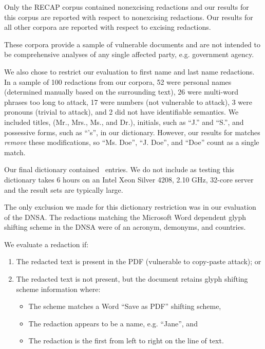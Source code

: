 Only the RECAP corpus contained nonexcising redactions and our results for this corpus are reported with respect to nonexcising redactions.
Our results for all other corpora are reported with respect to excising redactions.

These corpora provide a sample of vulnerable documents and are not intended to be comprehensive analyses of any single affected party, e.g. government agency.

We also chose to restrict our evaluation to first name and last name redactions.
In a sample of 100 redactions from our corpora, 52 were personal names (determined manually based on the surrounding text), 26 were multi-word phrases too long to attack, 17 were numbers (not vulnerable to attack), 3 were pronouns (trivial to attack), and 2 did not have identifiable semantics.
We included titles, (Mr., Mrs., Ms., and Dr.), initials, such as ``J.'' and ``S.'', and possessive forms, such as ``'s'', in our dictionary.
However, our results for matches \emph{remove} these modifications, so ``Ms. Doe'', ``J. Doe'', and ``Doe'' count as a single match.

Our final dictionary contained \nameDictSizeComb\ entries.
We do not include \emph{\fnxlnname} as testing this dictionary takes 6 hours on an Intel Xeon Silver 4208, 2.10 GHz, 32-core server and the result sets are typically large.

The only exclusion we made for this dictionary restriction was in our evaluation of the DNSA.
The redactions matching the Microsoft Word dependent glyph shifting scheme in the DNSA were of an acronym, demonyms, and countries.

We evaluate a redaction if:

\begin{enumerate}[nosep]
    \item The redacted text is present in the PDF (vulnerable to copy-paste attack); or
    \item The redacted text is not present, but the document retains glyph shifting scheme information where:
        \begin{itemize}[nosep]
            \item The scheme matches a Word ``Save as PDF'' shifting scheme,
            \item The redaction appears to be a name, e.g. ``Jane'', and
            \item The redaction is the first from left to right on the line of text.
        \end{itemize}
\end{enumerate}

